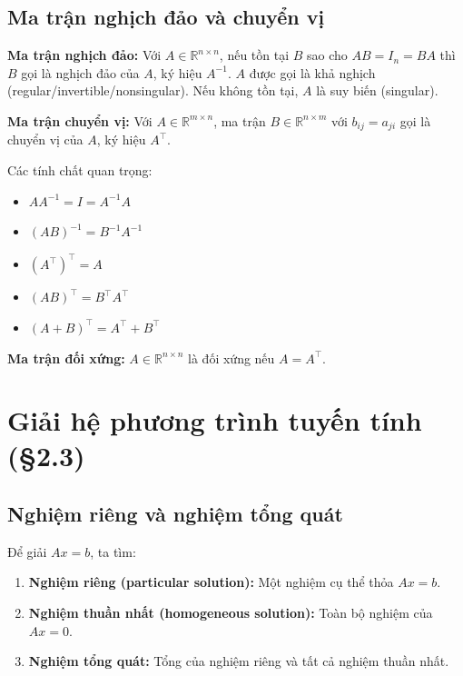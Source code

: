 \documentclass[12pt,a4paper]{article}
\begin{document}
\subsection{Ma trận nghịch đảo và chuyển vị}

\begin{dinhnghia}
\textbf{Ma trận nghịch đảo:} Với $A \in \mathbb{R}^{n \times n}$, nếu tồn tại $B$ sao cho $AB = I_n = BA$ thì $B$ gọi là nghịch đảo của $A$, ký hiệu $A^{-1}$. $A$ được gọi là khả nghịch (regular/invertible/nonsingular). Nếu không tồn tại, $A$ là suy biến (singular).
\end{dinhnghia}

\begin{dinhnghia}
\textbf{Ma trận chuyển vị:} Với $A \in \mathbb{R}^{m \times n}$, ma trận $B \in \mathbb{R}^{n \times m}$ với $b_{ij} = a_{ji}$ gọi là chuyển vị của $A$, ký hiệu $A^\top$.
\end{dinhnghia}

\begin{dinhly}
Các tính chất quan trọng:
\begin{itemize}
  \item $AA^{-1} = I = A^{-1}A$
  \item $(AB)^{-1} = B^{-1}A^{-1}$
  \item $(A^\top)^\top = A$
  \item $(AB)^\top = B^\top A^\top$
  \item $(A + B)^\top = A^\top + B^\top$
\end{itemize}
\end{dinhly}

\begin{dinhnghia}
\textbf{Ma trận đối xứng:} $A \in \mathbb{R}^{n \times n}$ là đối xứng nếu $A = A^\top$.
\end{dinhnghia}

\section{Giải hệ phương trình tuyến tính (§2.3)}

\subsection{Nghiệm riêng và nghiệm tổng quát}

Để giải $Ax = b$, ta tìm:
\begin{enumerate}
  \item \textbf{Nghiệm riêng (particular solution):} Một nghiệm cụ thể thỏa $Ax = b$.
  \item \textbf{Nghiệm thuần nhất (homogeneous solution):} Toàn bộ nghiệm của $Ax = 0$.
  \item \textbf{Nghiệm tổng quát:} Tổng của nghiệm riêng và tất cả nghiệm thuần nhất.
\end{enumerate}
\end{document}
